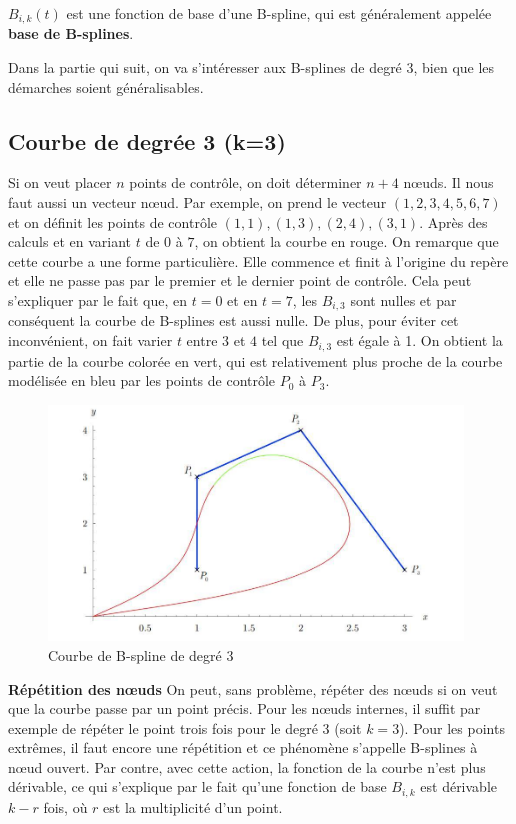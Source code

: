 \documentclass{article}
\begin{document}
$B_{i,k}(t)$ est une fonction de base d'une B-spline, qui est g\'{e}n\'{e}ralement appel\'{e}e \textbf{base de B-splines}.

Dans la partie qui suit, on va s'int\'{e}resser aux B-splines de degr\'{e} 3, bien que les d\'{e}marches soient g\'{e}n\'{e}ralisables.


\subsection{Courbe de degr\'ee 3 (k=3)}

Si on veut placer $n$ points de contr\^ole, on doit d\'{e}terminer $n+4$ n\oe uds. Il nous faut aussi un vecteur n\oe ud. Par exemple, on prend le vecteur $(1,2,3,4,5,6,7)$ et on d\'{e}finit les points de contr\^ole $(1,1),(1,3),(2,4),(3,1)$. Apr\`es des calculs et en variant $t$ de $0$ \`a $7$, on obtient la courbe en rouge. On remarque que cette courbe a une forme particuli\`ere. Elle commence et finit \`a l'origine du rep\`{e}re et elle ne passe pas par le premier et le dernier point de contr\^ole. Cela peut s'expliquer par le fait que, en $t=0$ et en $t=7$, les $B_{i,3}$ sont nulles et par cons\'{e}quent la courbe de B-splines est aussi nulle. De plus, pour \'eviter cet inconv\'{e}nient, on fait varier $t$ entre $3$ et $4$ tel que $B_{i,3}$ est \'{e}gale \`a 1. On obtient la partie de la courbe color\'{e}e en vert, qui est relativement plus proche de la courbe mod\'{e}lis\'{e}e en bleu par les points de contr\^ole $P_{0}$ \`a $P_{3}$.

\begin{figure}[h]
	\centering
	\includegraphics[width=11cm]{Courbe-B-splines.jpg}
	\caption{Courbe de B-spline de degr\'e 3 }
\end{figure}

\textbf{R\'{e}p\'{e}tition des n\oe uds}
On peut, sans probl\`eme, r\'{e}p\'{e}ter des n\oe uds si on veut que la courbe passe par un point pr\'{e}cis. Pour les n\oe uds internes, il suffit par exemple de r\'{e}p\'{e}ter le point trois fois pour le degr\'{e} 3 (soit $k=3$). Pour les points extr\^{e}mes, il faut encore une r\'{e}p\'{e}tition et ce ph\'{e}nom\`{e}ne s'appelle B-splines \`a n\oe ud ouvert. Par contre, avec cette action, la fonction de la courbe n'est plus d\'{e}rivable, ce qui s'explique par le fait qu'une fonction de base $B_{i,k}$ est d\'{e}rivable $k-r$ fois, o\`u $r$ est la multiplicit\'{e} d'un point. 
\end{document}

